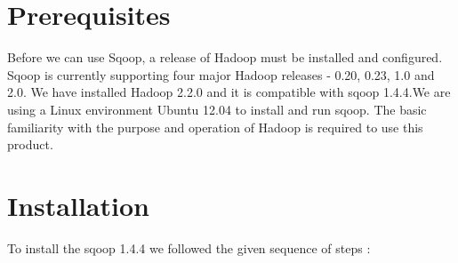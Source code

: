 \documentclass[a4paper,12pt,oneside]{sphinxmanual}
\begin{document}
\section{Prerequisites}
\label{document:id13}
Before we can use Sqoop, a release of Hadoop must be installed and configured. Sqoop is currently supporting four major Hadoop releases - 0.20, 0.23, 1.0 and 2.0. We have installed Hadoop 2.2.0 and it is compatible with sqoop 1.4.4.We are using a Linux environment Ubuntu 12.04 to install and run sqoop. The basic familiarity with the purpose and operation of Hadoop is required to use this product.


\section{Installation}
\label{document:id14}
To install the sqoop 1.4.4 we followed the given sequence of steps :
\end{document}
